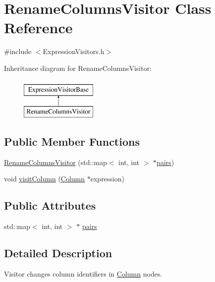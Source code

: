 \hypertarget{class_rename_columns_visitor}{\section{Rename\+Columns\+Visitor Class Reference}
\label{class_rename_columns_visitor}
}


{\ttfamily \#include $<$Expression\+Visitors.\+h$>$}

Inheritance diagram for Rename\+Columns\+Visitor\+:\begin{figure}[H]
\begin{center}
\leavevmode
\includegraphics[height=2.000000cm]{class_rename_columns_visitor}
\end{center}
\end{figure}
\subsection*{Public Member Functions}
\begin{DoxyCompactItemize}
\item 
\hyperlink{class_rename_columns_visitor_a119cb79b414164ac4bb2adcfaf6bdcf9}{Rename\+Columns\+Visitor} (std\+::map$<$ int, int $>$ $\ast$\hyperlink{class_rename_columns_visitor_a40542b4f59af34a28e298d719ca426c1}{pairs})
\item 
void \hyperlink{class_rename_columns_visitor_a45835dde3fa3190a803493a0e3f1e75a}{visit\+Column} (\hyperlink{class_column}{Column} $\ast$expression)
\end{DoxyCompactItemize}
\subsection*{Public Attributes}
\begin{DoxyCompactItemize}
\item 
std\+::map$<$ int, int $>$ $\ast$ \hyperlink{class_rename_columns_visitor_a40542b4f59af34a28e298d719ca426c1}{pairs}
\end{DoxyCompactItemize}


\subsection{Detailed Description}
Visitor changes column identifiers in \hyperlink{class_column}{Column} nodes. 

